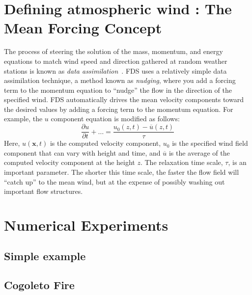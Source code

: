 \documentclass[journal,article,atmosphere,submit,moreauthors,pdftex]{Definitions/mdpi}
\begin{document}






\section{Defining atmospheric wind : The Mean Forcing Concept} \label{sec:wind}

The process of steering the solution of the mass, momentum, and energy equations to match wind speed and direction gathered at random weather stations is known as \emph{data assimilation}~\cite{Kalnay:2003}. FDS uses a relatively simple data assimilation technique, a method known as \emph{nudging}, where you add a forcing term to the momentum equation to ``nudge'' the flow in the direction of the specified wind. FDS automatically drives the mean velocity components toward the desired values by adding a forcing term to the momentum equation. For example, the $u$ component equation is modified as follows:
\begin{equation}
   \frac{\partial u}{\partial t} + \ldots = \frac{u_0(z,t)-\overline{u}(z,t)}{\tau} \label{mean_forcing_u}
\end{equation}
Here, $u(\mathbf{x},t)$ is the computed velocity component, $u_0$ is the specified wind field component that can vary with height and time, and $\overline{u}$ is the average of the computed velocity component at the height $z$. The relaxation time scale, $\tau$, is an important parameter. The shorter this time scale, the faster the flow field will ``catch up'' to the mean wind, but at the expense of possibly washing out important flow structures. 

\section{Numerical Experiments} \label{sec:numexp}





\subsection{Simple example}  \label{sec:simexp}




\subsection{Cogoleto Fire}  \label{sec:cogo}
\end{document}
